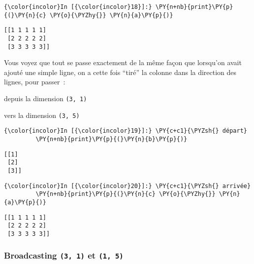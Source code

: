     \begin{Verbatim}[commandchars=\\\{\},frame=single,framerule=0.3mm,rulecolor=\color{cellframecolor}]
{\color{incolor}In [{\color{incolor}18}]:} \PY{n+nb}{print}\PY{p}{(}\PY{n}{c} \PY{o}{\PYZhy{}} \PY{n}{a}\PY{p}{)}
\end{Verbatim}


    \begin{Verbatim}[commandchars=\\\{\},frame=single,framerule=0.3mm,rulecolor=\color{cellframecolor}]
[[1 1 1 1 1]
 [2 2 2 2 2]
 [3 3 3 3 3]]
\end{Verbatim}

    Vous voyez que tout se passe exactement de la même façon que lorsqu'on
avait ajouté une simple ligne, on a cette fois ``tiré'' la colonne dans
la direction des lignes, pour passer~:

    depuis la dimension \texttt{(3,\ 1)}

    vers la dimension \texttt{(3,\ 5)}

    \begin{Verbatim}[commandchars=\\\{\},frame=single,framerule=0.3mm,rulecolor=\color{cellframecolor}]
{\color{incolor}In [{\color{incolor}19}]:} \PY{c+c1}{\PYZsh{} départ}
         \PY{n+nb}{print}\PY{p}{(}\PY{n}{b}\PY{p}{)}
\end{Verbatim}


    \begin{Verbatim}[commandchars=\\\{\},frame=single,framerule=0.3mm,rulecolor=\color{cellframecolor}]
[[1]
 [2]
 [3]]
\end{Verbatim}

    \begin{Verbatim}[commandchars=\\\{\},frame=single,framerule=0.3mm,rulecolor=\color{cellframecolor}]
{\color{incolor}In [{\color{incolor}20}]:} \PY{c+c1}{\PYZsh{} arrivée}
         \PY{n+nb}{print}\PY{p}{(}\PY{n}{c} \PY{o}{\PYZhy{}} \PY{n}{a}\PY{p}{)}
\end{Verbatim}


    \begin{Verbatim}[commandchars=\\\{\},frame=single,framerule=0.3mm,rulecolor=\color{cellframecolor}]
[[1 1 1 1 1]
 [2 2 2 2 2]
 [3 3 3 3 3]]
\end{Verbatim}

    \hypertarget{broadcasting-3-1-et-1-5}{%
\subsubsection{\texorpdfstring{Broadcasting \texttt{(3,\ 1)} et
\texttt{(1,\ 5)}}{Broadcasting (3, 1) et (1, 5)}}\label{broadcasting-3-1-et-1-5}}

